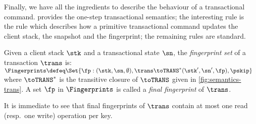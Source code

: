%
\begin{figure*}[!t]
\hrulefill
\caption{Semantics rules for transactional commands}
\label{fig:semantics-trans}
\end{figure*}

Finally, we have all the ingredients to describe the behaviour of a transactional command.   provides the one-step transactional semantics; 
the interesting rule is the  rule which describes how a primitive transactional command updates the client stack, the snapshot and the fingerprint; 
the remaining rules are standard.

\begin{definition}
Given a client stack $\stk$ and a transactional state $\sn$, the \emph{fingerprint set} of a transaction $\trans$ is:
\(
\Fingerprints \defeq \Set{\fp : (\stk, \sn, \emptyset), \trans \toTRANS^* (\stk', \sn', \fp), \pskip }
\)
where $\toTRANS^*$ is the transitive closure of $\toTRANS$ given in \cref{fig:semantics-trans}.  
A set $\fp$ in $\Fingerprints$ is called a \emph{final fingerprint} of $\trans$. 
\end{definition}
\noindent It is immediate to see that final fingerprints of $\trans$ contain at most one read (resp.\ one write) operation per key.


